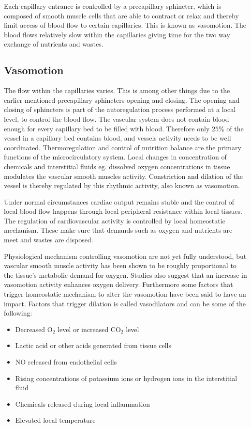 Each capillary entrance is controlled by a precapillary sphincter, which is composed of smooth muscle cells that are able to contract or relax and thereby limit access of blood flow to certain capillaries. This is known as vasomotion. The blood flows relatively slow within the capillaries giving time for the two way exchange of nutrients and wastes.\cite{martini2012}

\subsection{Vasomotion}

The flow within the capillaries varies. This is among other things due to the earlier mentioned precapillary sphincters opening and closing. The opening and closing of sphincters is part of the autoregulation process performed at a local level, to control the blood flow. The vascular system does not contain blood enough for every capillary bed to be filled with blood. Therefore only $25\%$ of the vessel in a capillary bed contains blood, and vessels activity needs to be well coordinated. Thermoregulation and control of nutrition balance are the primary functions of the microcirculatory system. Local changes in concentration of chemicals and interstitial fluids eg. dissolved oxygen concentrations in tissue modulates the vascular smooth muscles activity. Constriction and dilation of the vessel is thereby regulated by this rhythmic activity, also known as vasomotion. \cite{martini2012,geyer2004}

Under normal circumstances cardiac output remains stable and the control of local blood flow happens through local peripheral resistance within local tissues. The regulation of cardiovascular activity is controlled by local homeostatic mechanism. These make sure that demands such as oxygen and nutrients are meet and wastes are disposed.\cite{martini2012}

Physiological mechanism controlling vasomotion are not yet fully understood, but vascular smooth muscle activity has been shown to be roughly proportional to the tissue’s metabolic demand for oxygen.\cite{geyer2004} Studies also suggest that an increase in vasomotion activity enhances oxygen delivery\cite{goldman2001}. Furthermore some factors that trigger homeostatic mechanism to alter the vasomotion have been said to have an impact. Factors that trigger dilation is called vasodilators and can be some of the following:\cite{martini2012,geyer2004}  
\begin{itemize}
	\item Decreased O$_{2}$ level or increased CO$_{2}$ level
	\item Lactic acid or other acids generated from tissue cells
	\item NO released from endothelial cells
	\item Rising concentrations of potassium ions or hydrogen ions in the interstitial fluid
	\item Chemicals released during local inflammation
	\item Elevated local temperature
\end{itemize} 

